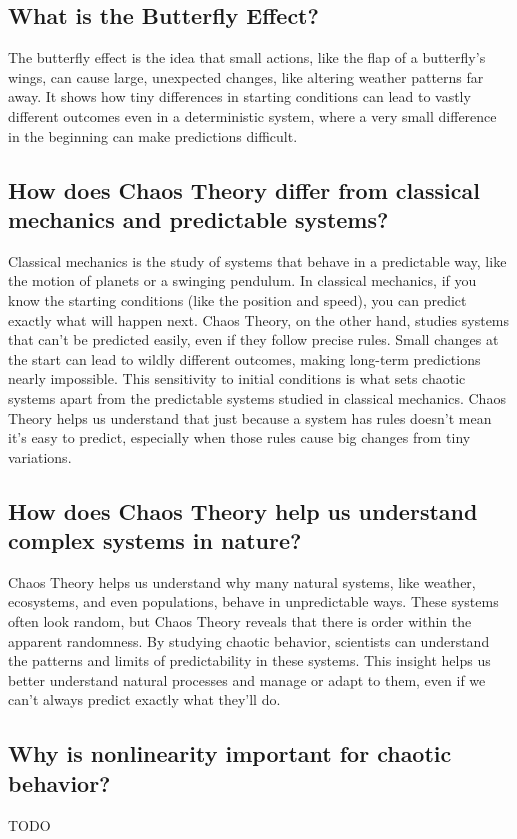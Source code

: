 \documentclass[12pt]{article}
\begin{document}
\subsection{What is the Butterfly Effect?}

The butterfly effect is the idea that small actions, like the flap of a butterfly’s wings, can cause large, unexpected changes, like altering weather patterns far away. It shows how tiny differences in starting conditions can lead to vastly different outcomes even in a deterministic system, where a very small difference in the beginning can make predictions difficult.

\subsection{How does Chaos Theory differ from classical mechanics and predictable systems?}
Classical mechanics is the study of systems that behave in a predictable way, like the motion of planets or a swinging pendulum. In classical mechanics, if you know the starting conditions (like the position and speed), you can predict exactly what will happen next. Chaos Theory, on the other hand, studies systems that can’t be predicted easily, even if they follow precise rules. Small changes at the start can lead to wildly different outcomes, making long-term predictions nearly impossible. This sensitivity to initial conditions is what sets chaotic systems apart from the predictable systems studied in classical mechanics. Chaos Theory helps us understand that just because a system has rules doesn’t mean it’s easy to predict, especially when those rules cause big changes from tiny variations.

\subsection{How does Chaos Theory help us understand complex systems in nature?}
Chaos Theory helps us understand why many natural systems, like weather, ecosystems, and even populations, behave in unpredictable ways. These systems often look random, but Chaos Theory reveals that there is order within the apparent randomness. By studying chaotic behavior, scientists can understand the patterns and limits of predictability in these systems. This insight helps us better understand natural processes and manage or adapt to them, even if we can’t always predict exactly what they’ll do.


\subsection{Why is nonlinearity important for chaotic behavior?}
TODO
\end{document}
